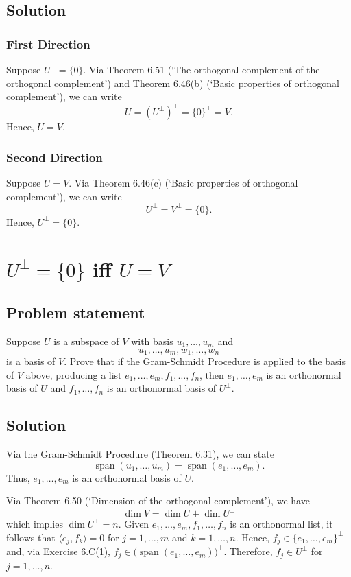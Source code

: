 \documentclass{article}
\begin{document}
\subsection*{Solution}
\subsubsection*{First Direction}
Suppose $U^\bot=\{0\}$. 
Via Theorem 6.51 (`The orthogonal complement of the orthogonal complement') and Theorem 6.46(b) (`Basic properties of orthogonal complement'), we can write
\[U=(U^\bot)^\bot=\{0\}^\bot=V.\]
Hence, $U=V$.

\subsubsection*{Second Direction}
Suppose $U=V$. 
Via Theorem 6.46(c) (`Basic properties of orthogonal complement'), we can write
\[U^\bot=V^\bot=\{0\}.\]
Hence, $U^\bot=\{0\}$.

\clearpage

\section{$U^\bot=\{0\}$ iff $U=V$}
\subsection*{Problem statement}
Suppose $U$ is a subspace of $V$ with basis $u_1,\ldots,u_m$ and
\[u_1,\ldots,u_m,w_1,\ldots,w_n\]
is a basis of $V$. 
Prove that if the Gram-Schmidt Procedure is applied to the basis of $V$ above, producing a list $e_1,\ldots,e_m,f_1,\ldots,f_n$, then $e_1,\ldots,e_m$ is an orthonormal basis of $U$ and $f_1,\ldots,f_n$ is an orthonormal basis of $U^\bot$.

\subsection*{Solution}
Via the Gram-Schmidt Procedure (Theorem 6.31), we can state
\[\operatorname{span}(u_1,\ldots,u_m)=\operatorname{span}(e_1,\ldots,e_m).\]
Thus, $e_1,\ldots,e_m$ is an orthonormal basis of $U$. 

Via Theorem 6.50 (`Dimension of the orthogonal complement'), we have 
\[\dim V= \dim U+\dim U^\bot\]
which implies $\dim U^\bot=n$. 
Given $e_1,\ldots,e_m,f_1,\ldots,f_n$ is an orthonormal list, it follows that $\langle e_j, f_k\rangle=0$ for $j=1,\ldots,m$ and $k=1,\ldots,n$. 
Hence, \newline$f_j\in\{ e_1,\ldots, e_m\}^\bot$ and, via Exercise 6.C(1), $f_j\in\big(\operatorname{span}(e_1,\ldots,e_m)\big)^\bot$.
Therefore, $f_j\in U^\bot$ for $j=1,\ldots,n$.
\end{document}
